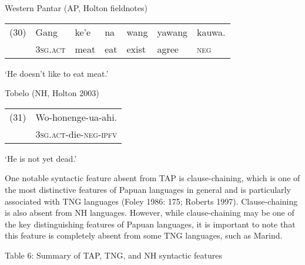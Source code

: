 Western Pantar (AP, Holton fieldnotes)

\begin{flushleft}
\tablehead{}
\begin{supertabular}{m{0.32545984in}m{0.59625983in}m{0.36845985in}m{0.24975985in}m{0.40185985in}m{0.5469598in}m{0.5087598in}}
(30) &
Gang &
ke{\textquoteright}e &
na &
wang &
yawang &
kauwa.\\
 &
\textsc{3sg.act} &
meat &
eat &
exist &
agree &
\textsc{neg}\\
\end{supertabular}
\end{flushleft}
{\textquoteleft}He doesn{\textquoteright}t like to eat meat.{\textquoteright} 

Tobelo (NH, Holton 2003)

\begin{flushleft}
\tablehead{}
\begin{supertabular}{m{0.32545984in}m{1.4629599in}}
(31) &
Wo-honenge-ua-ahi.\\
 &
\textsc{3sg.act}{}-die-\textsc{neg-ipfv}\\
\end{supertabular}
\end{flushleft}
{\textquoteleft}He is not yet dead.{\textquoteright} 

One notable syntactic feature absent from TAP is clause-chaining, which is one of the most distinctive features of Papuan languages in general and is particularly associated with TNG languages (Foley 1986: 175; Roberts 1997). Clause-chaining is also absent from NH languages. However, while clause-chaining may be one of the key distinguishing features of Papuan languages, it is important to note that this feature is completely absent from some TNG languages, such as Marind. 

{\centering
Table 6: Summary of TAP, TNG, and NH syntactic features
\par}

